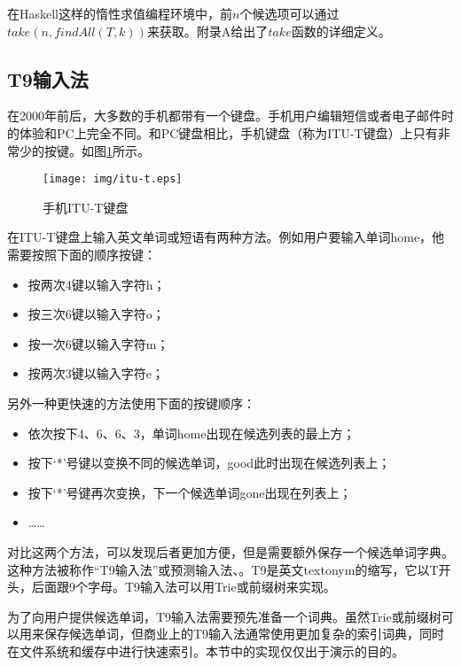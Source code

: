 \documentclass[UTF8]{article}
\begin{document}
在Haskell这样的惰性求值编程环境中，前$n$个候选项可以通过$take(n, findAll(T, k))$来获取。附录A给出了$take$函数的详细定义。


\subsection{T9输入法}

在2000年前后，大多数的手机都带有一个键盘。手机用户编辑短信或者电子邮件时的体验和PC上完全不同。和PC键盘相比，手机键盘（称为ITU-T键盘）上只有非常少的按键。如图\ref{fig:itut-keypad}所示。

\begin{figure}[htbp]
  \centering
  \texttt{[image: img/itu-t.eps]}
  \caption{手机ITU-T键盘}
  \label{fig:itut-keypad}
\end{figure}

在ITU-T键盘上输入英文单词或短语有两种方法。例如用户要输入单词home，他需要按照下面的顺序按键：

\begin{itemize}
\item 按两次4键以输入字符h；
\item 按三次6键以输入字符o；
\item 按一次6键以输入字符m；
\item 按两次3键以输入字符e；
\end{itemize}

另外一种更快速的方法使用下面的按键顺序：

\begin{itemize}
\item 依次按下4、6、6、3，单词home出现在候选列表的最上方；
\item 按下‘*’号键以变换不同的候选单词，good此时出现在候选列表上；
\item 按下‘*’号键再次变换，下一个候选单词gone出现在列表上；
\item ……
\end{itemize}

对比这两个方法，可以发现后者更加方便，但是需要额外保存一个候选单词字典。这种方法被称作“T9输入法”或预测输入法\cite{wiki-t9}、\cite {wiki-predictive-text}。T9是英文textonym的缩写，它以T开头，后面跟9个字母。T9输入法可以用Trie或前缀树来实现。

为了向用户提供候选单词，T9输入法需要预先准备一个词典。虽然Trie或前缀树可以用来保存候选单词，但商业上的T9输入法通常使用更加复杂的索引词典，同时在文件系统和缓存中进行快速索引。本节中的实现仅仅出于演示的目的。
\end{document}
